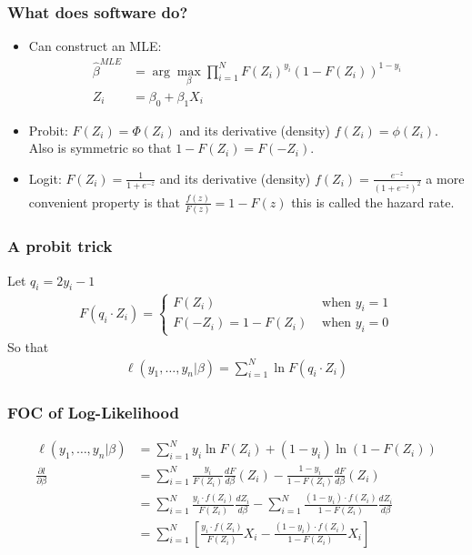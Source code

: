\documentclass[aspectratio=169,11pt]{beamer}
\begin{document}
\begin{frame}
\frametitle{What does software do?}
\begin{itemize}
\item Can construct an MLE:
\begin{align*}
\hat{\beta}^{MLE} &= \arg \max_{\beta} \prod_{i=1}^N F(Z_i)^{y_i} (1-F(Z_i))^{1-{y_i} }\\
Z_i &= \beta_0 + \beta_1 X_i
\end{align*}
\item Probit: $F(Z_i) = \Phi(Z_i)$ and its derivative (density) $f(Z_i) = \phi(Z_i)$. \\
Also is \alert{symmetric} so that $1 - F(Z_i) = F(-Z_i)$.
\item Logit: $F(Z_i) = \frac{1}{1+e^{-z}}$ and its derivative (density) $f(Z_i) = \frac{e^{-z}}{(1+e^{-z})^2}$ a more convenient property is that $\frac{f(z)}{F(z)} = 1 - F(z)$ this is called the \alert{hazard rate}.
\end{itemize}
\end{frame}

\begin{frame}
\frametitle{A probit trick}
Let $q_i = 2 y_i -1$
\begin{align*}
F(q_i \cdot Z_i) = 
\begin{cases}
F(Z_i)  &\mbox{ when } y_i=1 \\
F(-Z_i) = 1-F(Z_i)& \mbox{ when } y_i=0
\end{cases}
\end{align*}
So that 
\begin{align*}
\ell(y_1,\ldots, y_n | \beta) = \sum_{i=1}^N \ln F(q_i \cdot Z_i) 
\end{align*}
\end{frame}


\begin{frame}
\frametitle{FOC of Log-Likelihood}
\begin{align*}
\ell(y_1,\ldots,y_n | \beta) &= \sum_{i=1}^N y_i \ln F(Z_i) + (1-y_i) \ln(1- F(Z_i)) \\
\frac{\partial l }{\partial \beta} &= \sum_{i=1}^N \frac{y_i}{ F(Z_i)} \frac{ d F}{d \beta}(Z_i) - \frac{1-y_i}{1-F(Z_i)}  \frac{ d F}{d \beta} (Z_i)\\
 &= \sum_{i=1}^N \frac{y_i \cdot f(Z_i) }{ F(Z_i)} \frac{ d Z_i}{d \beta} -  \sum_{i=1}^N \frac{(1-y_i)\cdot f(Z_i) }{1-F(Z_i)} \frac{ d Z_i}{d \beta} \\
 &= \sum_{i=1}^N  \left[ \frac{y_i \cdot f(Z_i) }{ F(Z_i)} X_i -  \frac{(1-y_i)\cdot f(Z_i) }{1-F(Z_i)} X_i \right] 
\end{align*}
\end{frame}
\end{document}
